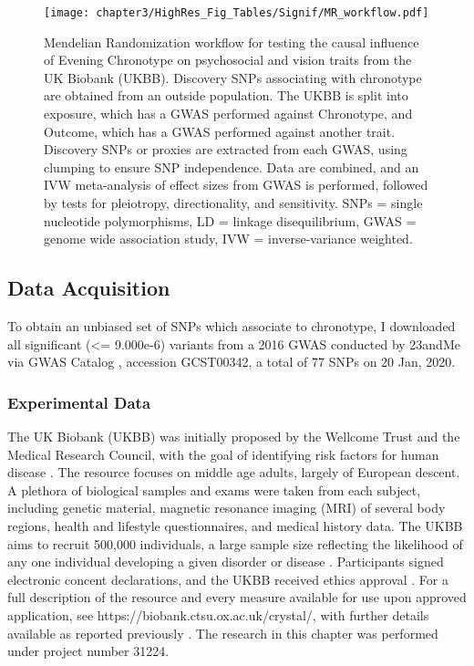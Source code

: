 \documentclass[journal,article,submit,moreauthors,pdftex]{Definitions/mdpi}
\begin{document}
\begin{figure}[htbp]
	\centering
	\texttt{[image: chapter3/HighRes\_Fig\_Tables/Signif/MR\_workflow.pdf]}
	\caption[Mendelian randomization workflow]{Mendelian Randomization workflow for testing the causal influence of Evening Chronotype on psychosocial and vision traits from the UK Biobank (UKBB). Discovery SNPs associating with chronotype are obtained from an outside population. The UKBB is split into exposure, which has a GWAS performed against Chronotype, and Outcome, which has a GWAS performed against another trait. Discovery SNPs or proxies are extracted from each GWAS, using clumping to ensure SNP independence. Data are combined, and an IVW meta-analysis of effect sizes from GWAS is performed, followed by tests for pleiotropy, directionality, and sensitivity. SNPs = single nucleotide polymorphisms, LD = linkage disequilibrium, GWAS = genome wide association study, IVW = inverse-variance weighted.}
	\label{fig:MR_Workflow}
\end{figure}

\subsection{Data Acquisition}
To obtain an unbiased set of SNPs which associate to chronotype, I downloaded all significant (<= 9.000e-6) variants from a 2016 GWAS conducted by 23andMe \citep{hu_gwas_2016} via GWAS Catalog \citep{gwas_catalog}, accession GCST00342, a total of 77 SNPs on 20 Jan, 2020. 

\subsubsection{Experimental Data}
The UK Biobank (UKBB) \citep{bycroft_uk_2018} was initially proposed by the Wellcome Trust and the Medical Research Council, with the goal of identifying risk factors for human disease \citep{collins_what_2012}. The resource focuses on middle age adults, largely of European descent. A plethora of biological samples and exams were taken from each subject, including genetic material, magnetic resonance imaging (MRI) of several body regions, health and lifestyle questionnaires, and medical history data. The UKBB aims to recruit 500,000 individuals, a large sample size reflecting the likelihood of any one individual developing a given disorder or disease \citep{collins_what_2012}. Participants signed electronic concent declarations, and the UKBB received ethics approval \citep{bycroft_uk_2018}. For a full description of the resource and every measure available for use upon approved application, see https://biobank.ctsu.ox.ac.uk/crystal/, with further details available as reported previously \citep{bycroft_uk_2018,collins_what_2012}. The research in this chapter was performed under project number 31224. 
\end{document}
